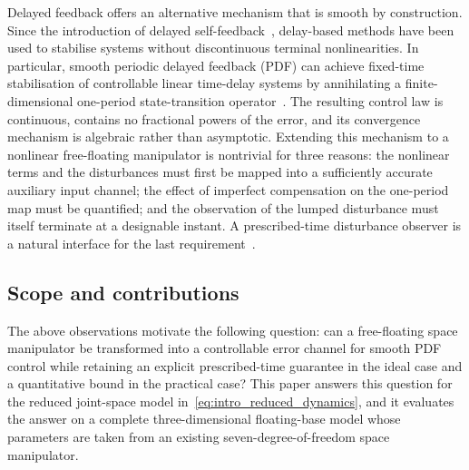 Delayed feedback offers an alternative mechanism that is smooth by construction. Since the introduction of delayed self-feedback~\cite{pyragas1992}, delay-based methods have been used to stabilise systems without discontinuous terminal nonlinearities. In particular, smooth periodic delayed feedback (PDF) can achieve fixed-time stabilisation of controllable linear time-delay systems by annihilating a finite-dimensional one-period state-transition operator~\cite{zhouFixedtimeStabilizationLinear2022}. The resulting control law is continuous, contains no fractional powers of the error, and its convergence mechanism is algebraic rather than asymptotic. Extending this mechanism to a nonlinear free-floating manipulator is nontrivial for three reasons: the nonlinear terms and the disturbances must first be mapped into a sufficiently accurate auxiliary input channel; the effect of imperfect compensation on the one-period map must be quantified; and the observation of the lumped disturbance must itself terminate at a designable instant. A prescribed-time disturbance observer is a natural interface for the last requirement~\cite{jiangPrescribedtimeDisturbanceObserver2024}.

\subsection{Scope and contributions}
The above observations motivate the following question: can a free-floating space manipulator be transformed into a controllable error channel for smooth PDF control while retaining an explicit prescribed-time guarantee in the ideal case and a quantitative bound in the practical case? This paper answers this question for the reduced joint-space model in~\eqref{eq:intro_reduced_dynamics}, and it evaluates the answer on a complete three-dimensional floating-base model whose parameters are taken from an existing seven-degree-of-freedom space manipulator.

